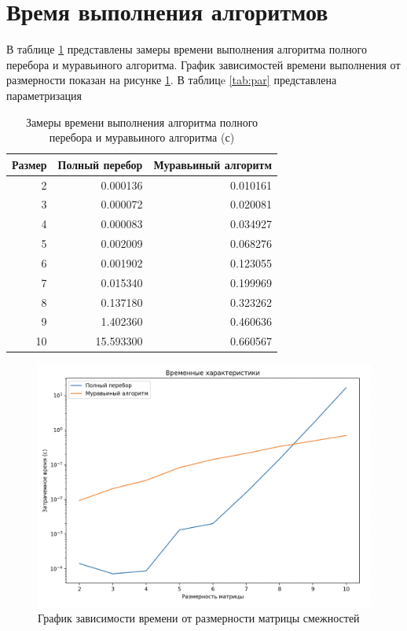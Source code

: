 \section{Время выполнения алгоритмов}

В таблице \ref{tab:time} представлены замеры времени выполнения алгоритма полного перебора и 
муравьиного алгоритма. График зависимостей времени выполнения от размерности показан 
на рисунке \ref{img:dem}. В таблицe \ref{tab:par} представлена параметризация

\begin{table}[!ht]
    \centering
    \caption{\label{tab:time}Замеры времени выполнения алгоритма полного перебора и 
    муравьиного алгоритма (с)}
    \begin{tabular}{|r|r|r|}
    \hline
        Размер & Полный перебор & Муравьиный алгоритм  \\ \hline
        2 & 0.000136 & 0.010161  \\ \hline
        3 & 0.000072 & 0.020081  \\ \hline
        4 & 0.000083 & 0.034927  \\ \hline
        5 & 0.002009 & 0.068276  \\ \hline
        6 & 0.001902 & 0.123055  \\ \hline
        7 & 0.015340 & 0.199969  \\ \hline
        8 & 0.137180 & 0.323262  \\ \hline
        9 & 1.402360 & 0.460636  \\ \hline
        10 & 15.593300 & 0.660567 \\ \hline
    \end{tabular}
\end{table}

\begin{figure}[h]
	\centering
	\includegraphics[height=0.50\textheight]{img/graph.png}
	\caption{График зависимости времени от размерности матрицы смежностей}
	\label{img:dem}
\end{figure}

